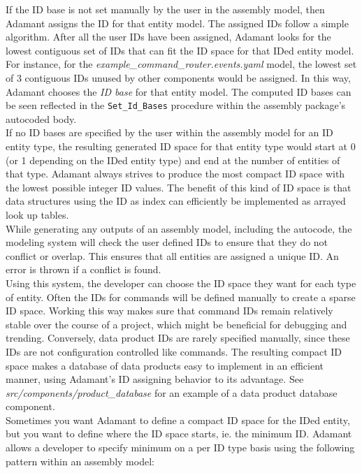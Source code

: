 If the ID base is not set manually by the user in the assembly model, then Adamant assigns the ID for that entity model. The assigned IDs follow a simple algorithm. After all the user IDs have been assigned, Adamant looks for the lowest contiguous set of IDs that can fit the ID space for that IDed entity model. For instance, for the \textit{example\_command\_router.events.yaml} model, the lowest set of 3 contiguous IDs unused by other components would be assigned. In this way, Adamant chooses the \textit{ID base} for that entity model. The computed ID bases can be seen reflected in the \texttt{Set\_Id\_Bases} procedure within the assembly package's autocoded body. \\

If no ID bases are specified by the user within the assembly model for an ID entity type, the resulting generated ID space for that entity type would start at 0 (or 1 depending on the IDed entity type) and end at the number of entities of that type. Adamant always strives to produce the most compact ID space with the lowest possible integer ID values. The benefit of this kind of ID space is that data structures using the ID as index can efficiently be implemented as arrayed look up tables. \\

While generating any outputs of an assembly model, including the autocode, the modeling system will check the user defined IDs to ensure that they do not conflict or overlap. This ensures that all entities are assigned a unique ID. An error is thrown if a conflict is found. \\

Using this system, the developer can choose the ID space they want for each type of entity. Often the IDs for commands will be defined manually to create a sparse ID space. Working this way makes sure that command IDs remain relatively stable over the course of a project, which might be beneficial for debugging and trending. Conversely, data product IDs are rarely specified manually, since these IDs are not configuration controlled like commands. The resulting compact ID space makes a database of data products easy to implement in an efficient manner, using Adamant's ID assigning behavior to its advantage. See \textit{src/components/product\_database} for an example of a data product database component. \\

Sometimes you want Adamant to define a compact ID space for the IDed entity, but you want to define where the ID space starts, ie. the minimum ID. Adamant allows a developer to specify minimum on a per ID type basis using the following pattern within an assembly model: \\

